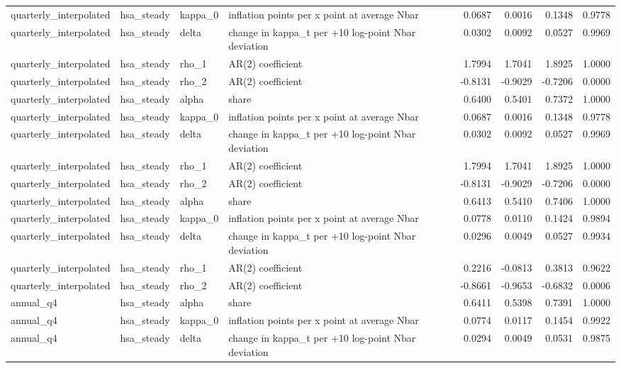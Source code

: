 \begin{tabular}{llllrrrr}
quarterly\_interpolated & hsa\_steady & kappa\_0 & inflation points per x point at average Nbar & 0.0687 & 0.0016 & 0.1348 & 0.9778 \\
quarterly\_interpolated & hsa\_steady & delta & change in kappa\_t per +10 log-point Nbar deviation & 0.0302 & 0.0092 & 0.0527 & 0.9969 \\
quarterly\_interpolated & hsa\_steady & rho\_1 & AR(2) coefficient & 1.7994 & 1.7041 & 1.8925 & 1.0000 \\
quarterly\_interpolated & hsa\_steady & rho\_2 & AR(2) coefficient & -0.8131 & -0.9029 & -0.7206 & 0.0000 \\
quarterly\_interpolated & hsa\_steady & alpha & share & 0.6400 & 0.5401 & 0.7372 & 1.0000 \\
quarterly\_interpolated & hsa\_steady & kappa\_0 & inflation points per x point at average Nbar & 0.0687 & 0.0016 & 0.1348 & 0.9778 \\
quarterly\_interpolated & hsa\_steady & delta & change in kappa\_t per +10 log-point Nbar deviation & 0.0302 & 0.0092 & 0.0527 & 0.9969 \\
quarterly\_interpolated & hsa\_steady & rho\_1 & AR(2) coefficient & 1.7994 & 1.7041 & 1.8925 & 1.0000 \\
quarterly\_interpolated & hsa\_steady & rho\_2 & AR(2) coefficient & -0.8131 & -0.9029 & -0.7206 & 0.0000 \\
quarterly\_interpolated & hsa\_steady & alpha & share & 0.6413 & 0.5410 & 0.7406 & 1.0000 \\
quarterly\_interpolated & hsa\_steady & kappa\_0 & inflation points per x point at average Nbar & 0.0778 & 0.0110 & 0.1424 & 0.9894 \\
quarterly\_interpolated & hsa\_steady & delta & change in kappa\_t per +10 log-point Nbar deviation & 0.0296 & 0.0049 & 0.0527 & 0.9934 \\
quarterly\_interpolated & hsa\_steady & rho\_1 & AR(2) coefficient & 0.2216 & -0.0813 & 0.3813 & 0.9622 \\
quarterly\_interpolated & hsa\_steady & rho\_2 & AR(2) coefficient & -0.8661 & -0.9653 & -0.6832 & 0.0006 \\
annual\_q4 & hsa\_steady & alpha & share & 0.6411 & 0.5398 & 0.7391 & 1.0000 \\
annual\_q4 & hsa\_steady & kappa\_0 & inflation points per x point at average Nbar & 0.0774 & 0.0117 & 0.1454 & 0.9922 \\
annual\_q4 & hsa\_steady & delta & change in kappa\_t per +10 log-point Nbar deviation & 0.0294 & 0.0049 & 0.0531 & 0.9875 \\

\end{tabular}
